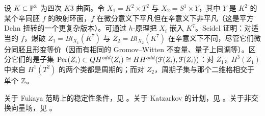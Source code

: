 
\begin{Example} 设 $K \subset \mathbb{P}^3$ 为四次 $K3$ 曲面。令 $X_1 = K^2 \times T^2$ 与 $X_2 = S^1 \times Y$，其中 $Y$ 是 $K^2$ 的某个辛同胚 $f$ 的映射环面，$f$ 在微分意义下平凡但在辛意义下非平凡（这是平方 Dehn 扭转的一个更复杂版本）。可通过 $h$-原理把 $X_i$ 嵌入 $K^7$。Seidel \cite{Seidel:Flux} 证明：对适当的 $f$，爆破 $Z_1 = Bl_{X_1}(K^7)$ 与 $Z_2 = Bl_{X_2}(K^7)$ 在辛意义下不同，尽管它们微分同胚且形变等价（因而有相同的 Gromov--Witten 不变量、量子上同调等）。区分它们的是子集 $\mathrm{Per}(Z_i) \subset QH^{odd}(Z_i) \cong HH^{odd}(\EuScript{F}(Z_i),\EuScript{F}(Z_i))$：对 $Z_1$，$H^3(Z_1)$ 中来自 $H^1(T^2)$ 的两个类都是周期的；而对 $Z_2$，周期子集与那个二维格相交于单个 $\mathbb{Z}$。
\end{Example}


\begin{Notes}
关于 Fukaya 范畴上的稳定性条件，见 \cite{KS, Smith:quiver, Thomas:braid}。关于 Katzarkov 的计划，见 \cite{BallardEtAl,KatzarkovKerr, Katzarkov}。关于非交换向量场，见 \cite{Seidel-Solomon, Seidel:Flux, AbouzaidSmith:arc}。
\end{Notes}
